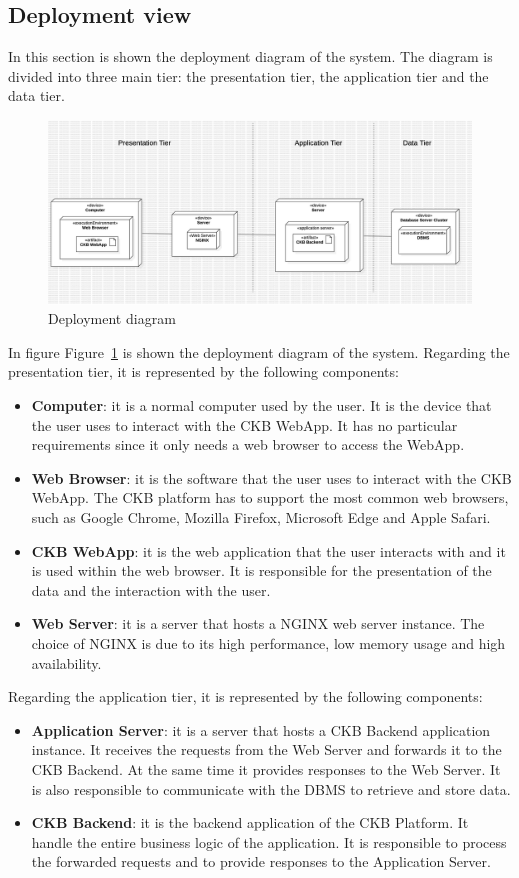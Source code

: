 \subsection{Deployment view}
In this section is shown the deployment diagram of the system. The diagram is divided into three main tier: the presentation tier, the application tier and the data tier. 
\begin{figure}[H]
    \centering
    \includegraphics[width=\textwidth]{Diagrams/DeploymentDiagram.jpg}
    \caption{Deployment diagram}
    \label{fig:deployment_diagram}
\end{figure}
In figure Figure\ \ref{fig:deployment_diagram} is shown the deployment diagram of the system.
Regarding the presentation tier, it is represented by the following components:
\begin{itemize}
    \item \textbf{Computer}: it is a normal computer used by the user. It is the device that the user uses to interact with the CKB WebApp. It has no particular requirements since it only needs a web browser to access the WebApp.
    \item \textbf{Web Browser}: it is the software that the user uses to interact with the CKB WebApp. The CKB platform has to support the most common web browsers, such as Google Chrome, Mozilla Firefox, Microsoft Edge and Apple Safari.
    \item \textbf{CKB WebApp}: it is the web application that the user interacts with and it is used within the web browser. It is responsible for the presentation of the data and the interaction with the user.
    \item \textbf{Web Server}: it is a server that hosts a NGINX web server instance. The choice of NGINX is due to its high performance, low memory usage and high availability.
\end{itemize}
Regarding the application tier, it is represented by the following components:
\begin{itemize}
    \item \textbf{Application Server}: it is a server that hosts a CKB Backend application instance. It receives the requests from the Web Server and forwards it to the CKB Backend. At the same time it provides responses to the Web Server. It is also responsible to communicate with the DBMS to retrieve and store data.
    \item \textbf{CKB Backend}: it is the backend application of the CKB Platform. It handle the entire business logic of the application. It is responsible to process the forwarded requests and to provide responses to the Application Server.
\end{itemize}
